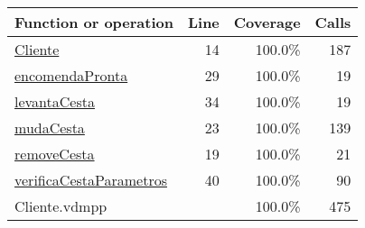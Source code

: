 \bigskip
\begin{longtable}{|l|r|r|r|}
\hline
Function or operation & Line & Coverage & Calls \\
\hline
\hline
\hyperref[Cliente:14]{Cliente} & 14&100.0\% & 187 \\
\hline
\hyperref[encomendaPronta:29]{encomendaPronta} & 29&100.0\% & 19 \\
\hline
\hyperref[levantaCesta:34]{levantaCesta} & 34&100.0\% & 19 \\
\hline
\hyperref[mudaCesta:23]{mudaCesta} & 23&100.0\% & 139 \\
\hline
\hyperref[removeCesta:19]{removeCesta} & 19&100.0\% & 21 \\
\hline
\hyperref[verificaCestaParametros:40]{verificaCestaParametros} & 40&100.0\% & 90 \\
\hline
\hline
Cliente.vdmpp & & 100.0\% & 475 \\
\hline
\end{longtable}

